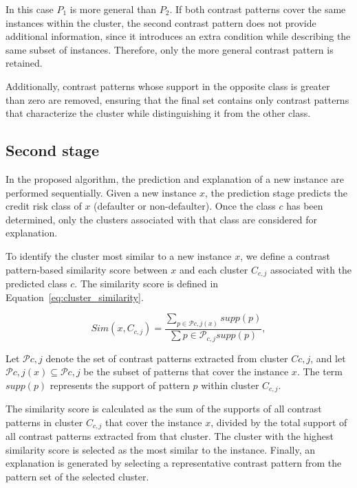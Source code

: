 {       	In this case $P_{1}$ is more general than $P_{2}$. If both contrast patterns cover the same instances within the cluster, the second contrast pattern does not provide additional information, since it introduces an extra condition while describing the same subset of instances. Therefore, only the more general contrast pattern is retained. \newline
       	
       	Additionally, contrast patterns whose support in the opposite class is greater than zero are removed, ensuring that the final set contains only contrast patterns that characterize the cluster while distinguishing it from the other class.
        
       \subsection{Second stage}
       In the proposed algorithm, the prediction and explanation of a new instance are performed sequentially. Given a new instance $x$, the prediction stage predicts the credit risk class of $x$ (defaulter or non-defaulter). Once the class $c$ has been determined, only the clusters associated with that class are considered for explanation.\newline
       	
       To identify the cluster most similar to a new instance $x$, we define a contrast pattern-based similarity score between $x$ and each cluster $C_{c,j}$ associated with the predicted class $c$. The similarity score is defined in Equation~\ref{eq:cluster_similarity}.
       	
       \begin{equation}
       		Sim(x, C_{c,j})
       		=
       		\frac{
       			\sum\limits_{p \in \mathcal{P}{c,j}(x)} supp(p)
       		}{
       			\sum\limits{p \in \mathcal{P}_{c,j}} supp(p)
       		},
       		\label{eq:cluster_similarity}
       	\end{equation}
       	
       Let $\mathcal{P}{c,j}$ denote the set of contrast patterns extracted from cluster $C{c,j}$, and let $\mathcal{P}{c,j}(x) \subseteq \mathcal{P}{c,j}$ be the subset of patterns that cover the instance $x$. The term $supp(p)$ represents the support of pattern $p$ within cluster $C_{c,j}$.\newline
       	
       The similarity score is calculated as the sum of the supports of all contrast patterns in cluster $C_{c,j}$ that cover the instance $x$, divided by the total support of all contrast patterns extracted from that cluster. The cluster with the highest similarity score is selected as the most similar to the instance. Finally, an explanation is generated by selecting a representative contrast pattern from the pattern set of the selected cluster.\newline
       	
}
